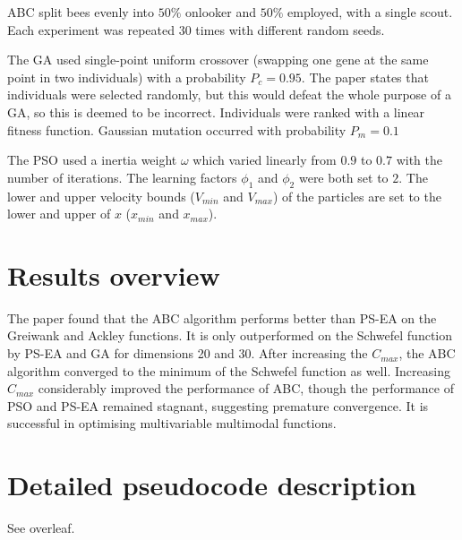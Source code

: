 \documentclass{article}
\begin{document}
ABC split bees evenly into $50\%$ onlooker and $50\%$ employed, with a single scout. Each experiment was repeated 30 times with different random seeds.

The GA used single-point uniform crossover (swapping one gene at the same point in two individuals) with a probability $P_c = 0.95$. The paper states that individuals were selected randomly, but this would defeat the whole purpose of a GA, so this is deemed to be incorrect. Individuals were ranked with a linear fitness function. Gaussian mutation occurred with probability $P_m=0.1$

The PSO used a inertia weight $\omega$ which varied linearly from $0.9$ to $0.7$ with the number of iterations. The learning factors $\phi_1$ and $\phi_2$ were both set to $2$. The lower and upper velocity bounds ($V_{min}$ and $V_{max}$) of the particles are set to the lower and upper of $x$ ($x_{min}$ and $x_{max}$).

\section{Results overview}

The paper found that the ABC algorithm performs better than PS-EA on the Greiwank and Ackley functions. It is only outperformed on the Schwefel function by PS-EA and GA for dimensions 20 and 30. After increasing the $C_{max}$, the ABC algorithm converged to the minimum of the Schwefel function as well. Increasing $C_{max}$ considerably improved the performance of ABC, though the performance of PSO and PS-EA remained stagnant, suggesting premature convergence. It is successful in optimising multivariable multimodal functions.


\section{Detailed pseudocode description}

See overleaf.
\end{document}
